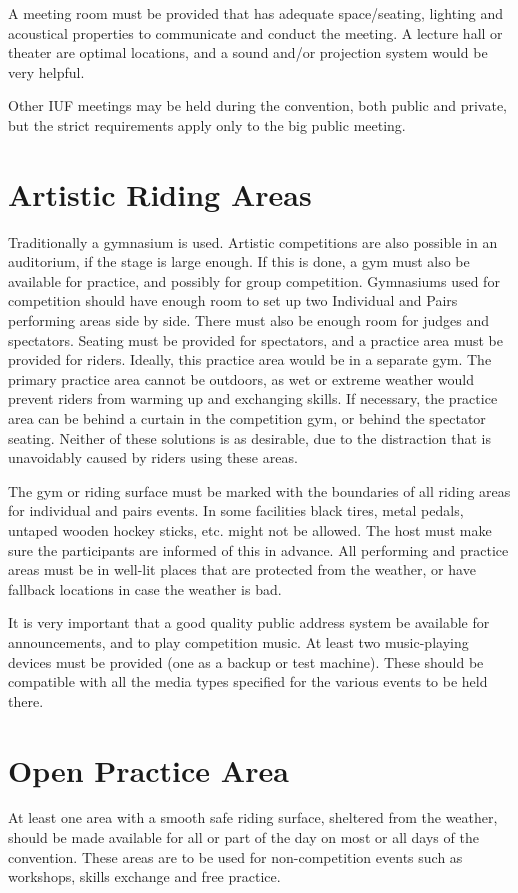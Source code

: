 A meeting room must be provided that has adequate space/seating, lighting and acoustical properties to communicate and conduct the meeting.
A lecture hall or theater are optimal locations, and a sound and/or projection system would be very helpful.

Other IUF meetings may be held during the convention, both public and private, but the strict requirements apply only to the big public meeting.

\section{Artistic Riding Areas}
Traditionally a gymnasium is used.
Artistic competitions are also possible in an auditorium, if the stage is large enough.
If this is done, a gym must also be available for practice, and possibly for group competition.
Gymnasiums used for competition should have enough room to set up two Individual and Pairs performing areas side by side.
There must also be enough room for judges and spectators.
Seating must be provided for spectators, and a practice area must be provided for riders.
Ideally, this practice area would be in a separate gym.
The primary practice area cannot be outdoors, as wet or extreme weather would prevent riders from warming up and exchanging skills.
If necessary, the practice area can be behind a curtain in the competition gym, or behind the spectator seating.
Neither of these solutions is as desirable, due to the distraction that is unavoidably caused by riders using these areas.

The gym or riding surface must be marked with the boundaries of all riding areas for individual and pairs events.
In some facilities black tires, metal pedals, untaped wooden hockey sticks, etc.
might not be allowed.
The host must make sure the participants are informed of this in advance.
All performing and practice areas must be in well-lit places that are protected from the weather, or have fallback locations in case the weather is bad.

It is very important that a good quality public address system be available for announcements, and to play competition music.
At least two music-playing devices must be provided (one as a backup or test machine).
These should be compatible with all the media types specified for the various events to be held there.

\section{Open Practice Area}
At least one area with a smooth safe riding surface, sheltered from the weather, should be made available for all or part of the day on most or all days of the convention.
These areas are to be used for non-competition events such as workshops, skills exchange and free practice.

